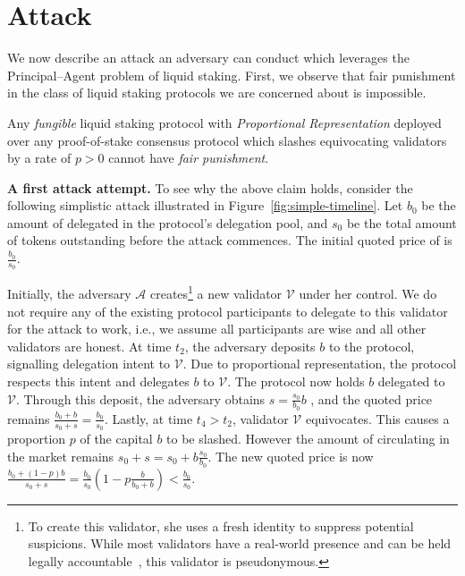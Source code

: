 \section{Attack}\label{sec:attack}

We now describe an attack an adversary can conduct which leverages the
Principal--Agent problem of liquid staking. First, we observe that
fair punishment in the class of liquid staking protocols we are concerned
about is impossible.

\begin{claim}
Any \emph{fungible} liquid staking protocol with \emph{Proportional Representation}
deployed over any proof-of-stake consensus protocol which slashes equivocating validators by a rate of $p > 0$
cannot have \emph{fair punishment}.
\end{claim}

\noindent
\textbf{A first attack attempt.}
To see why the above claim holds, consider the following simplistic attack
illustrated in Figure~\ref{fig:simple-timeline}.
Let $b_0$ be the amount of delegated \asset in the protocol's delegation pool,
and $s_0$ be the total amount of \stasset tokens outstanding
before the attack commences. The initial quoted price of \stasset
is $\frac{b_0}{s_0}$.

Initially,
the adversary $\mathcal{A}$ creates\footnote{To create this validator, she uses a fresh identity
to suppress potential suspicions. While most validators
have a real-world presence and can be held legally
accountable~\cite{liquid-staking-report}, this validator is pseudonymous.}
a new validator $\mathcal{V}$ under her control.
We do not require any of the existing protocol participants to delegate
to this validator for the attack to work, i.e., we assume all participants
are wise and all other validators are honest.
At time $t_2$, the adversary deposits $b$ \asset to the protocol,
signalling delegation intent to $\mathcal{V}$.
Due to proportional representation,
the protocol respects this intent and delegates $b$ \asset to $\mathcal{V}$.
The protocol now holds $b$ delegated \asset to $\mathcal{V}$.
Through this deposit, the adversary obtains
$s = \frac{s_0}{b_0} b$ \stasset, and the quoted price remains
$\frac{b_0 + b}{s_0 + s} = \frac{b_0}{s_0}$.
Lastly, at time $t_4 > t_2$, validator
$\mathcal{V}$ equivocates. This causes a proportion $p$ of
the capital $b$ to be slashed.
However the amount of \stasset circulating in the
market remains $s_0 + s = s_0 + b\frac{s_0}{b_0}$.
The new quoted price is now
$\frac{b_0 + (1 - p)b}{s_0 + s} = \frac{b_0}{s_0}(1 - p\frac{b}{b_0 + b}) < \frac{b_0}{s_0}$.

